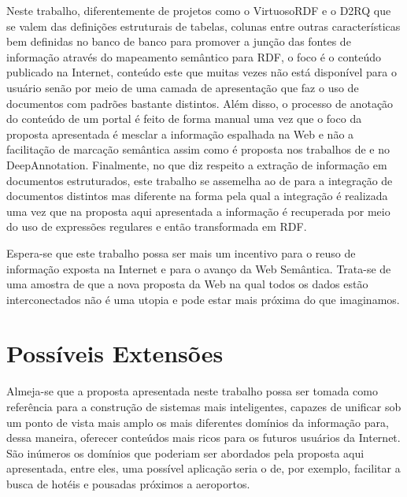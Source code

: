 Neste trabalho, diferentemente de projetos como o VirtuosoRDF e o D2RQ que se valem das definições estruturais de tabelas, colunas entre outras características bem definidas no banco de banco para promover a junção das fontes de informação através do mapeamento semântico para RDF, o foco é o conteúdo publicado na Internet, conteúdo este que muitas vezes não está disponível para o usuário senão por meio de uma camada de apresentação que faz o uso de documentos com padrões bastante distintos. Além disso, o processo de anotação do conteúdo de um portal é feito de forma manual uma vez que o foco da proposta apresentada é mesclar a informação espalhada na Web e não a facilitação de marcação semântica assim como é proposta nos trabalhos de \citep{AndreasHess} e no DeepAnnotation. Finalmente, no que diz respeito a extração de informação em documentos estruturados, este trabalho se assemelha ao de \citep{May} para a integração de documentos distintos mas diferente na forma pela qual a integração é realizada uma vez que na proposta aqui apresentada a informação é recuperada por meio do uso de expressões regulares e então transformada em RDF.


Espera-se que este trabalho possa ser mais um incentivo para o reuso de informação exposta na Internet e para o avanço da Web Semântica. Trata-se de uma amostra de que a nova proposta da Web na qual todos os dados estão interconectados não é uma utopia e pode estar mais próxima do que imaginamos. 

\section{Possíveis Extensões} 
\label{sec:sugestoes_para_persquisas_futuras}

Almeja-se que a proposta apresentada neste trabalho possa ser tomada como referência para a construção de sistemas mais inteligentes, capazes de unificar sob um ponto de vista mais amplo os mais diferentes domínios da informação para, dessa maneira, oferecer conteúdos mais ricos para os futuros usuários da Internet. São inúmeros os domínios que poderiam ser abordados pela proposta aqui apresentada, entre eles, uma possível aplicação seria o de, por exemplo, facilitar a busca de hotéis e pousadas próximos a aeroportos. 
 
